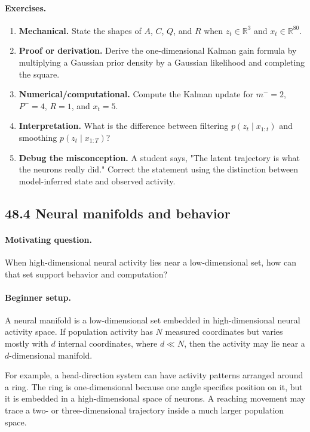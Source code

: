 \paragraph{Exercises.}
\begin{enumerate}[label=\textbf{48.3.\arabic*.}, leftmargin=*]
\item \textbf{Mechanical.} State the shapes of \(A\), \(C\), \(Q\), and \(R\) when \(z_t\in\mathbb R^3\) and \(x_t\in\mathbb R^{80}\).
\item \textbf{Proof or derivation.} Derive the one-dimensional Kalman gain formula by multiplying a Gaussian prior density by a Gaussian likelihood and completing the square.
\item \textbf{Numerical/computational.} Compute the Kalman update for \(m^-=2\), \(P^-=4\), \(R=1\), and \(x_t=5\).
\item \textbf{Interpretation.} What is the difference between filtering \(p(z_t\mid x_{1:t})\) and smoothing \(p(z_t\mid x_{1:T})\)?
\item \textbf{Debug the misconception.} A student says, "The latent trajectory is what the neurons really did." Correct the statement using the distinction between model-inferred state and observed activity.
\end{enumerate}

\subsection{48.4 Neural manifolds and behavior}

\paragraph{Motivating question.}
When high-dimensional neural activity lies near a low-dimensional set, how can that set support behavior and computation?

\paragraph{Beginner setup.}
A neural manifold is a low-dimensional set embedded in high-dimensional neural activity space. If population activity has \(N\) measured coordinates but varies mostly with \(d\) internal coordinates, where \(d\ll N\), then the activity may lie near a \(d\)-dimensional manifold.

For example, a head-direction system can have activity patterns arranged around a ring. The ring is one-dimensional because one angle specifies position on it, but it is embedded in a high-dimensional space of neurons. A reaching movement may trace a two- or three-dimensional trajectory inside a much larger population space.

